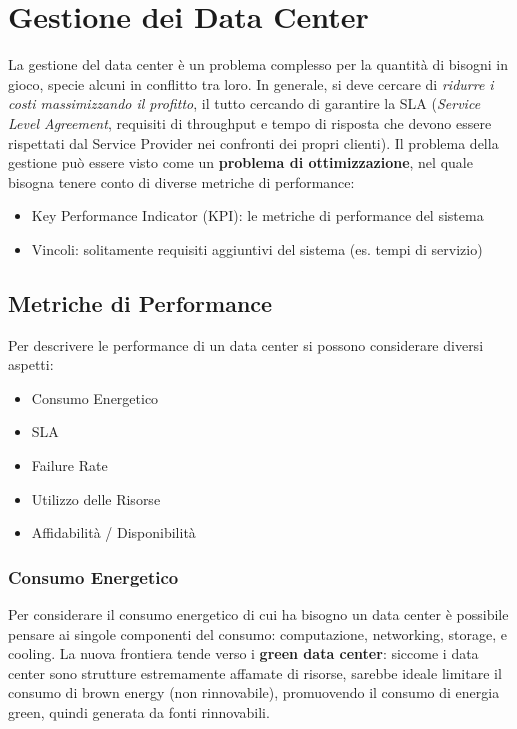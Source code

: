 \documentclass{article}
\providecommand{\tightlist}{%
		  \setlength{\itemsep}{0pt}\setlength{\parskip}{0pt}}
\begin{document}
		\newpage
		\section{Gestione dei Data Center}
		La gestione del data center è un problema complesso per la quantità di bisogni in gioco, specie alcuni in conflitto tra loro. In generale, si deve cercare di \emph{ridurre i costi massimizzando il profitto}, il tutto cercando di garantire la SLA (\emph{Service Level Agreement}, requisiti di throughput e tempo di risposta che devono essere rispettati dal Service Provider nei confronti dei propri clienti). Il problema	della gestione può essere visto come un \textbf{problema di ottimizzazione}, nel quale bisogna tenere conto di diverse metriche di performance:
		
		\begin{itemize}
		\tightlist
		\item
		  Key Performance Indicator (KPI): le metriche di performance del sistema
		\item
		  Vincoli: solitamente requisiti aggiuntivi del sistema (es.
		  tempi di servizio)
		\end{itemize}
		
		\subsection{Metriche di Performance}\label{metriche-di-performance}
		Per descrivere le performance di un data center si possono considerare	diversi aspetti:
		
		\begin{itemize}
		\tightlist
		\item
		  Consumo Energetico
		\item
		  SLA
		\item
		  Failure Rate
		\item
		  Utilizzo delle Risorse
		\item
		  Affidabilità / Disponibilità
		\end{itemize}
		\subsubsection{Consumo Energetico}
		Per considerare il consumo energetico di cui ha bisogno un data center è possibile pensare ai singole componenti del consumo:
		computazione, networking, storage, e cooling. La nuova frontiera tende verso i \textbf{green data center}: siccome i data center sono strutture estremamente affamate di risorse, sarebbe ideale limitare il consumo di brown energy (non rinnovabile), promuovendo il consumo di energia green, quindi generata da fonti rinnovabili.
		
\end{document}
